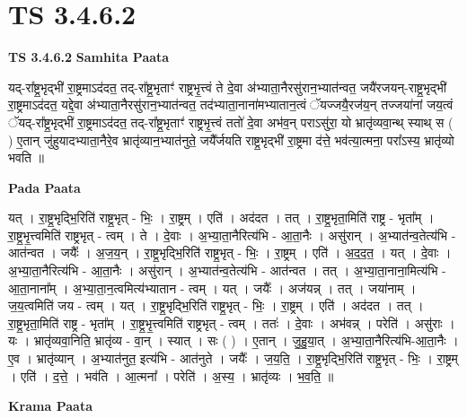 \documentclass[17pt]{extarticle}
\begin{document}
\section{ TS 3.4.6.2 }

\textbf{TS 3.4.6.2 } \newline
\textbf{Samhita Paata} \newline

यद्-रा᳚ष्ट्र॒भृद्भी॑ रा॒ष्ट्रमाऽद॑दत॒ तद्-रा᳚ष्ट्र॒भृताꣳ॑ राष्ट्रभृ॒त्त्वं ते दे॒वा अ॑भ्याता॒नैरसु॑रान॒भ्यात॑न्वत॒ जयै॑रजयन्-राष्ट्र॒भृद्भी॑ रा॒ष्ट्रमाऽद॑दत॒ यद्दे॒वा अ॑भ्याता॒नैरसु॑रान॒भ्यात॑न्वत॒ तद॑भ्याता॒नाना॑मभ्यातान॒त्वं ॅयज्जयै॒रज॑य॒न् तज्जया॑नां जय॒त्वं ॅयद्-रा᳚ष्ट्र॒भृद्भी॑ रा॒ष्ट्रमाऽद॑दत॒ तद्-रा᳚ष्ट्र॒भृताꣳ॑ राष्ट्रभृ॒त्त्वं ततो॑ दे॒वा अभ॑व॒न् पराऽसु॑रा॒ यो भ्रातृ॑व्यवा॒न्थ् स्याथ् स ( ) ए॒तान् जु॑हुयादभ्याता॒नैरे॒व भ्रातृ॑व्यान॒भ्यात॑नुते॒ जयै᳚र्जयति राष्ट्र॒भृद्भी॑ रा॒ष्ट्रमा द॑त्ते॒ भव॑त्या॒त्मना॒ परा᳚ऽस्य॒ भ्रातृ॑व्यो भवति ॥ \newline

\textbf{Pada Paata} \newline

यत् । रा॒ष्ट्र॒भृद्भि॒रिति॑ राष्ट्र॒भृत् - भिः॒ । रा॒ष्ट्रम् । एति॑ । अद॑दत । तत् । रा॒ष्ट्र॒भृता॒मिति॑ राष्ट्र - भृता᳚म् । रा॒ष्ट्र॒भृ॒त्त्वमिति॑ राष्ट्रभृत् - त्वम् । ते । दे॒वाः । अ॒भ्या॒ता॒नैरित्य॑भि - आ॒ता॒नैः । असु॑रान् । अ॒भ्यात॑न्व॒तेत्य॑भि - आत॑न्वत । जयैः᳚ । अ॒ज॒य॒न् । रा॒ष्ट्र॒भृद्भि॒रिति॑ राष्ट्र॒भृत् - भिः॒ । रा॒ष्ट्रम् । एति॑ । अ॒द॒द॒त॒ । यत् । दे॒वाः । अ॒भ्या॒ता॒नैरित्य॑भि - आ॒ता॒नैः । असु॑रान् । अ॒भ्यात॑न्व॒तेत्य॑भि - आत॑न्वत । तत् । अ॒भ्या॒ता॒नाना॒मित्य॑भि - आ॒ता॒नाना᳚म् । अ॒भ्या॒ता॒न॒त्वमित्य॑भ्यातान - त्वम् । यत् । जयैः᳚ । अज॑यन्न् । तत् । जया॑नाम् । ज॒य॒त्वमिति॑ जय - त्वम् । यत् । रा॒ष्ट्र॒भृद्भि॒रिति॑ राष्ट्र॒भृत् - भिः॒ । रा॒ष्ट्रम् । एति॑ । अद॑दत । तत् । रा॒ष्ट्र॒भृता॒मिति॑ राष्ट्र - भृता᳚म् । रा॒ष्ट्र॒भृ॒त्त्वमिति॑ राष्ट्रभृत् - त्वम् । ततः॑ । दे॒वाः । अभ॑वन्न् । परेति॑ । असु॑राः । यः । भ्रातृ॑व्यवा॒निति॒ भ्रातृ॑व्य - वा॒न् । स्यात् । सः ( ) । ए॒तान् । जु॒हु॒या॒त् । अ॒भ्या॒ता॒नैरित्य॑भि-आ॒ता॒नैः । ए॒व । भ्रातृ॑व्यान् । अ॒भ्यात॑नुत॒ इत्य॑भि - आत॑नुते । जयैः᳚ । ज॒य॒ति॒ । रा॒ष्ट्र॒भृद्भि॒रिति॑ राष्ट्र॒भृत् - भिः॒ । रा॒ष्ट्रम् । एति॑ । द॒त्ते॒ । भव॑ति । आ॒त्मना᳚ । परेति॑ । अ॒स्य॒ । भ्रातृ॑व्यः । भ॒व॒ति॒ ॥  \newline


\textbf{Krama Paata} \newline
\end{document}
